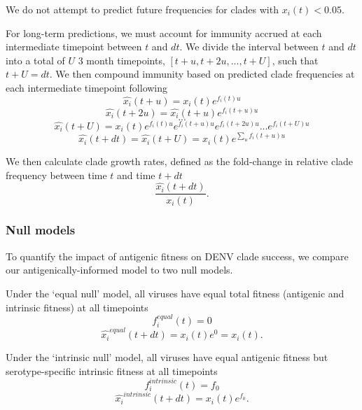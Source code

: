\documentclass[11pt,oneside,letterpaper]{article}
\begin{document}
We do not attempt to predict future frequencies for clades with $x_i(t) < 0.05$.

For long-term predictions, we must account for immunity accrued at each intermediate timepoint between $t$ and $dt$.
We divide the interval between $t$ and $dt$ into a total of $U$ 3 month timepoints, $[t+u, t+2u, ..., t+U]$, such that $t+U=dt$.
We then compound immunity based on predicted clade frequencies at each intermediate timepoint following
\begin{equation}
\hat{x_i}(t+u) = x_i(t)e^{f_i(t) u}
\end{equation}
\begin{equation}
\hat{x_i}(t+2u) = \hat{x_i}(t+u) e^{f_i(t+u)u}
\end{equation}
$$...$$
\begin{equation}
\hat{x_i}(t+U) = x_i(t) e^{f_i(t)u} e^{f_i(t+u)u} e^{f_i(t+2u)u} ... e^{f_i(t+U)u}
\end{equation}
\begin{equation}
  \label{eq_compounding_immunity}
\hat{x_i}(t+dt) = \hat{x_i}(t+U) = x_i(t) e^{\sum_{u}f_i(t+u)u}
\end{equation}

We then calculate clade growth rates, defined as the fold-change in relative clade frequency between time $t$ and time $t+dt$
\begin{equation}
  \label{eq_growth_rate}
\frac{\hat{x_i}(t+dt)}{x_i(t)}.
\end{equation}

\subsubsection*{Null models}
To quantify the impact of antigenic fitness on DENV clade success, we compare our antigenically-informed model to two null models.

Under the `equal null' model, all viruses have equal total fitness (antigenic and intrinsic fitness) at all timepoints
\begin{equation}
  \label{equal_null}
f_i^{equal}(t) = 0
\end{equation}
\begin{equation}
\hat{x_i}^{equal}(t+dt) = x_i(t) e^0 = x_i(t).
\end{equation}

Under the `intrinsic null' model, all viruses have equal antigenic fitness but serotype-specific intrinsic fitness at all timepoints
\begin{equation}
  \label{intrinsic_null}
  f_i^{intrinsic}(t) = f_0
\end{equation}
\begin{equation}
\hat{x_i}^{intrinsic}(t+dt) = x_i(t) e^{f_0}.
\end{equation}
\end{document}
